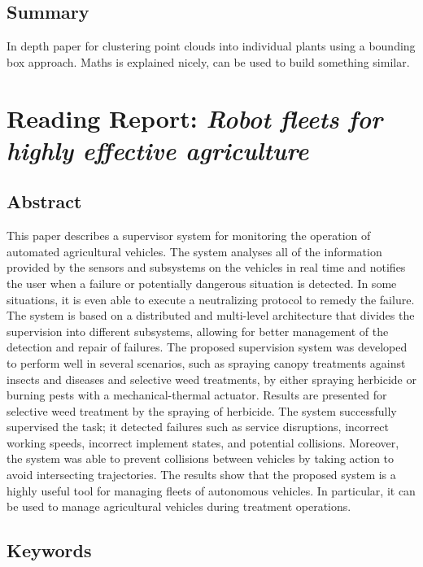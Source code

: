     \subsection*{Summary}
    In depth paper for clustering point clouds into individual plants using a bounding box approach.
    Maths is explained nicely, can be used to build something similar.
    

    \newpage
    
    \section{Reading Report: \emph{Robot fleets for highly effective agriculture}}
    \label{sec:ConesaMunoz2015}
    \cite{ConesaMunoz2015}
    
    \subsection*{Abstract}
    This paper describes a supervisor system for monitoring the operation of automated
    agricultural vehicles. The system analyses all of the information provided by the sensors and
    subsystems on the vehicles in real time and notifies the user when a failure or potentially
    dangerous situation is detected. In some situations, it is even able to execute a neutralizing
    protocol to remedy the failure. The system is based on a distributed and multi-level architecture
    that divides the supervision into different subsystems, allowing for better management of the
    detection and repair of failures. The proposed supervision system was developed to perform
    well in several scenarios, such as spraying canopy treatments against insects and diseases
    and selective weed treatments, by either spraying herbicide or burning pests with a
    mechanical-thermal actuator. Results are presented for selective weed treatment by the
    spraying of herbicide. The system successfully supervised the task; it detected failures such
    as service disruptions, incorrect working speeds, incorrect implement states, and potential
    collisions. Moreover, the system was able to prevent collisions between vehicles by taking
    action to avoid intersecting trajectories. The results show that the proposed system is a highly
    useful tool for managing fleets of autonomous vehicles. In particular, it can be used to
    manage agricultural vehicles during treatment operations.
    
    \subsection*{Keywords}
    
